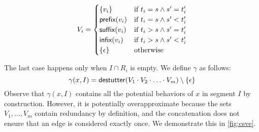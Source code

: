 \small
\begin{wrapfigure}{r}{0.5\textwidth}
	\vspace{-2em}
	\begin{equation} \label{eq:valexprset}
		V_i = 
		\begin{cases}
			\{v_i\} & \text{if } t_i = s \land s' = t_i' \\
			\textsf{prefix}(v_i) & \text{if } t_i = s \land s' < t_i' \\
			\textsf{suffix}(v_i) & \text{if } t_i > s \land s' = t_i' \\
			\textsf{infix}(v_i) & \text{if } t_i > s \land s' < t_i' \\
			\{\epsilon\} & \text{otherwise}
		\end{cases}
	\end{equation}
	\vspace{-2em}
\end{wrapfigure}
\normalsize
The last case happens only when \( I \cap R_i \) is empty.
We define \(\gamma\) as follows:
\[ \gamma(x,I) = \mathsf{destutter}(V_1 \cdot V_2 \cdot \ldots \cdot V_m) \setminus \{\epsilon\} \]
Observe that \(\gamma(x,I)\) contains all the potential behaviors of \( x \) in segment \( I \) by construction.
However, it is potentially overapproximate because the sets \( V_1, \ldots, V_m \) contain redundancy by definition, and the concatenation does not ensure that an edge is considered exactly once.
We demonstrate this in \cref{fig:csve}.





